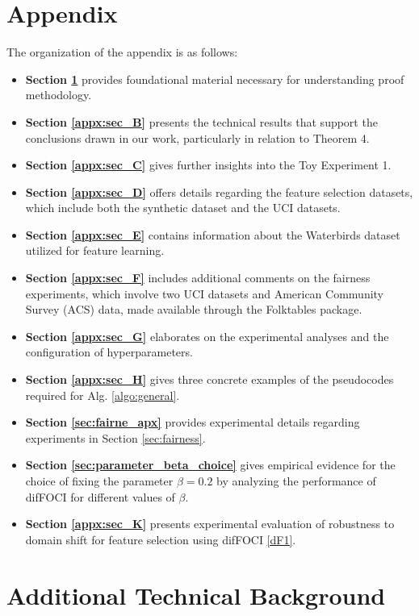 \section*{Appendix}


The organization of the appendix is as follows:

\begin{itemize}
    \item \textbf{Section \ref{appx:sec_A}} provides foundational material necessary for understanding proof methodology.
    \item \textbf{Section \ref{appx:sec_B}} presents the technical results that support the conclusions drawn in our work, particularly in relation to Theorem 4.
    \item \textbf{Section \ref{appx:sec_C}} gives further insights into the Toy Experiment 1.
    \item \textbf{Section \ref{appx:sec_D}} offers details regarding the feature selection datasets, which include both the synthetic dataset and the UCI datasets.
    \item \textbf{Section \ref{appx:sec_E}} contains information about the Waterbirds dataset utilized for feature learning.
    \item \textbf{Section \ref{appx:sec_F}} includes additional comments on the fairness experiments, which involve two UCI datasets and American Community Survey (ACS) data, made available through the Folktables package.
    \item \textbf{Section \ref{appx:sec_G}} elaborates on the experimental analyses and the configuration of hyperparameters.
    \item \textbf{Section \ref{appx:sec_H}} gives three concrete examples of the pseudocodes required for Alg. \ref{algo:general}.
    \item \textbf{Section \ref{sec:fairne_apx}} provides experimental details regarding experiments in Section \ref{sec:fairness}.
    \item \textbf{Section \ref{sec:parameter_beta_choice}} gives empirical evidence for the choice of fixing the parameter $\beta=0.2$ by analyzing the performance of difFOCI for different values of $\beta$.
    \item \textbf{Section \ref{appx:sec_K}} presents experimental evaluation of robustness to domain shift for feature selection using difFOCI \ref{dF1}.
\end{itemize}


\section{Additional Technical Background}
\label{appx:sec_A}
